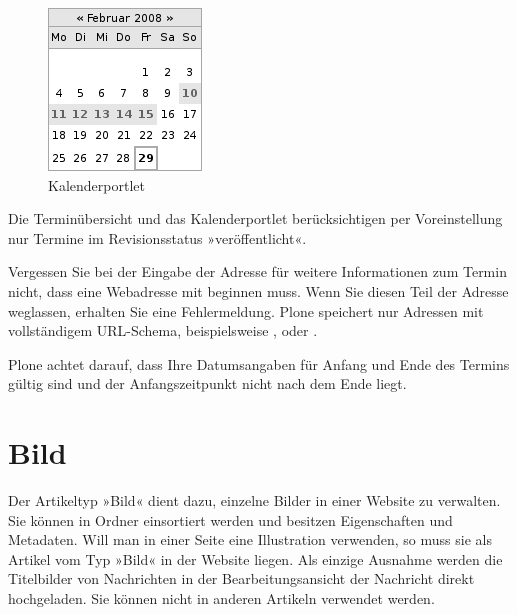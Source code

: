 \documentclass[a4paper,12pt,ngerman]{manual}
\begin{document}
\hypertarget{fig-portlet-calendar}{}\begin{figure}[htbp]
\centering

\includegraphics{portlet-calendar.png}
\caption{Kalenderportlet}\end{figure}

Die Terminübersicht und das Kalenderportlet berücksichtigen per Voreinstellung
nur Termine im Revisionsstatus »veröffentlicht«.

Vergessen Sie bei der Eingabe der Adresse für weitere Informationen zum Termin
nicht, dass eine Webadresse mit  beginnen muss. Wenn Sie
diesen Teil der Adresse weglassen, erhalten Sie eine Fehlermeldung. Plone
speichert nur Adressen mit vollständigem URL-Schema, beispielsweise
,  oder .

Plone achtet darauf, dass Ihre Datumsangaben für Anfang und Ende des Termins
gültig sind und der Anfangszeitpunkt nicht nach dem Ende liegt.

\resetcurrentobjects
\hypertarget{--doc-inhaltstypen/bild}{}

\hypertarget{sec-bild}{}\section{Bild}

Der Artikeltyp »Bild« dient dazu, einzelne Bilder in einer Website zu
verwalten. Sie können in Ordner einsortiert werden und besitzen Eigenschaften und Metadaten.
Will man in einer Seite eine Illustration verwenden, so muss sie als Artikel
vom Typ »Bild« in der Website liegen. Als einzige Ausnahme werden die
Titelbilder von Nachrichten in der Bearbeitungsansicht der Nachricht direkt
hochgeladen. Sie können nicht in anderen Artikeln verwendet werden.
\end{document}
